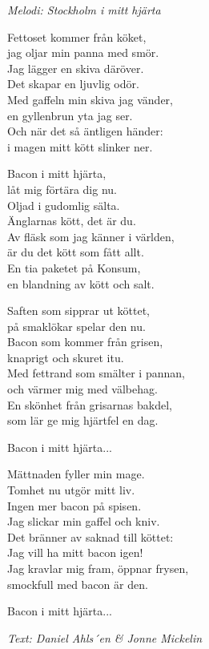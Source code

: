 {\footnotesize\textit{Melodi: Stockholm i mitt hjärta}}\par
\vspace{10pt}
Fettoset kommer från köket,\\
jag oljar min panna med smör.\\
Jag lägger en skiva däröver.\\
Det skapar en ljuvlig odör.\\
Med gaffeln min skiva jag vänder,\\
en gyllenbrun yta jag ser.\\
Och när det så äntligen händer:\\
i magen mitt kött slinker ner.\par
\vspace{10pt}
Bacon i mitt hjärta,\\
låt mig förtära dig nu.\\
Oljad i gudomlig sälta.\\
Änglarnas kött, det är du.\\
Av fläsk som jag känner i världen,\\
är du det kött som fått allt.\\
En tia paketet på Konsum,\\
en blandning av kött och salt.\par
\vspace{10pt}
Saften som sipprar ut köttet,\\
på smaklökar spelar den nu.\\
Bacon som kommer från grisen,\\
knaprigt och skuret itu.\\
Med fettrand som smälter i pannan,\\
och värmer mig med välbehag.\\
En skönhet från grisarnas bakdel,\\
som lär ge mig hjärtfel en dag.\par
\vspace{10pt}
Bacon i mitt hjärta...\par
\vspace{10pt}
Mättnaden fyller min mage.\\
Tomhet nu utgör mitt liv.\\
Ingen mer bacon på spisen.\\
Jag slickar min gaffel och kniv.\\
Det bränner av saknad till köttet:\\
Jag vill ha mitt bacon igen!\\
Jag kravlar mig fram, öppnar frysen,\\
smockfull med bacon är den.\par
\vspace{10pt}
Bacon i mitt hjärta...\par
\vspace{10pt}
{\footnotesize\textit{Text: Daniel Ahls´{e}n \& Jonne Mickelin}}
